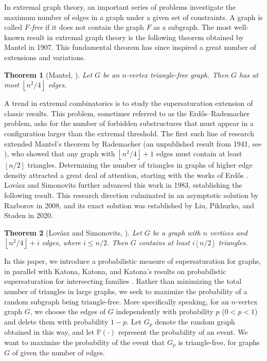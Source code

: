 \documentclass[11pt,a4paper]{article}
\newcommand{\bP}{\mathbb{P}}
\newtheorem{theorem}{Theorem}
\begin{document}
In extremal graph theory, an important series of problems investigate the maximum number of edges in a graph under a given set of constraints.  A graph is called \emph{$F$-free} if it does not contain the graph $F$ as a subgraph. The most well-known result in extremal graph theory is the following theorem obtained by  Mantel \cite{Man} in 1907.  This fundamental theorem has since inspired a great number of extensions and variations. 

\begin{theorem}[Mantel, \cite{Man}]\label{Man}
Let $G$ be an $n$-vertex triangle-free graph. Then  $G$ has at most $\left\lfloor n^2/4\right\rfloor$ edges.
\end{theorem}

A  trend in extremal combinatorics is to study the supersaturation extension of
classic results. This problem, sometimes referred to as the Erd\H{o}s–Rademacher problem,
asks for the number of forbidden substructures that must appear in a configuration larger
than the extremal threshold.  The first such line of research extended Mantel’s theorem by Rademacher  (an unpublished result from 1941, see \cite{Erd3}), who showed that any graph with $\left\lfloor n^2/4\right\rfloor+1$ edges must contain at least $\left\lfloor n/2 \right\rfloor$ triangles. Determining the number of triangles in graphs of higher edge density attracted a great deal of attention, starting with the works of Erd\H{o}s \cite{Erd1,Erd2}.  Lov\'{a}sz and Simonovits \cite{Lov} further advanced this work in 1983, establishing  the following result. This research direction culminated in an asymptotic solution by Razborov \cite{Raz} in 2008, and its exact solution was established by Liu, Pikhurko, and Staden \cite{Liu} in 2020.

\begin{theorem}[Lovász and Simonovits, \cite{Lov}]\label{lem:count}
Let  $G$ be a graph with  $n$ vertices and  $\left\lfloor n^2/4 \right\rfloor + i$ edges, where $i \le n/2$. Then $G$  contains at least $i\left\lfloor n/2\right\rfloor$ triangles.
\end{theorem}

In this paper, we introduce a probabilistic measure of supersaturation for graphs, in parallel with  Katona, Katona, and Katona's results on  probabilistic supersaturation  for intersecting families \cite{Kat}.  
Rather than minimizing the total number of triangles in large graphs, we seek to maximize the probability of a random subgraph being triangle-free. More specifically speaking, for an $n$-vertex graph $G$, we choose the edges of $G$ independently with probability $p$ ($0<p<1$) and delete them with probability $1-p$.  Let $G_p$ denote the random graph  obtained in this way, and let $\bP(\cdot)$ represent the probability of an event. We want to maximize the probability of the event that $G_p$ is triangle-free, for graphs $G$ of given the number of edges. 
\end{document}
